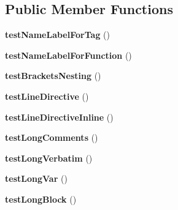 \subsection*{Public Member Functions}
\begin{DoxyCompactItemize}
\item 
{\bfseries test\+Name\+Label\+For\+Tag} ()\hypertarget{classTwig__Tests__LexerTest_a3e8c65c922ee2e01e28cb9a102680f26}{}\label{classTwig__Tests__LexerTest_a3e8c65c922ee2e01e28cb9a102680f26}

\item 
{\bfseries test\+Name\+Label\+For\+Function} ()\hypertarget{classTwig__Tests__LexerTest_a1dd9c2bc9781773c85f6ab7e5294fe8c}{}\label{classTwig__Tests__LexerTest_a1dd9c2bc9781773c85f6ab7e5294fe8c}

\item 
{\bfseries test\+Brackets\+Nesting} ()\hypertarget{classTwig__Tests__LexerTest_a5330331df783de91a7d963e8f913ae0c}{}\label{classTwig__Tests__LexerTest_a5330331df783de91a7d963e8f913ae0c}

\item 
{\bfseries test\+Line\+Directive} ()\hypertarget{classTwig__Tests__LexerTest_ac52526651062b252e591a610059a1b00}{}\label{classTwig__Tests__LexerTest_ac52526651062b252e591a610059a1b00}

\item 
{\bfseries test\+Line\+Directive\+Inline} ()\hypertarget{classTwig__Tests__LexerTest_af73b39a404ae5c05dbc7041067aa4c19}{}\label{classTwig__Tests__LexerTest_af73b39a404ae5c05dbc7041067aa4c19}

\item 
{\bfseries test\+Long\+Comments} ()\hypertarget{classTwig__Tests__LexerTest_a707a6b56ca0407f972f188404f28948b}{}\label{classTwig__Tests__LexerTest_a707a6b56ca0407f972f188404f28948b}

\item 
{\bfseries test\+Long\+Verbatim} ()\hypertarget{classTwig__Tests__LexerTest_a5d494e2384ddae767ab831a5e8b7b351}{}\label{classTwig__Tests__LexerTest_a5d494e2384ddae767ab831a5e8b7b351}

\item 
{\bfseries test\+Long\+Var} ()\hypertarget{classTwig__Tests__LexerTest_aa81861f773c89b804572518d101b7788}{}\label{classTwig__Tests__LexerTest_aa81861f773c89b804572518d101b7788}

\item 
{\bfseries test\+Long\+Block} ()\hypertarget{classTwig__Tests__LexerTest_a05b5b8ed206c07628c61a1d1515bdcee}{}\label{classTwig__Tests__LexerTest_a05b5b8ed206c07628c61a1d1515bdcee}


\end{DoxyCompactItemize}
